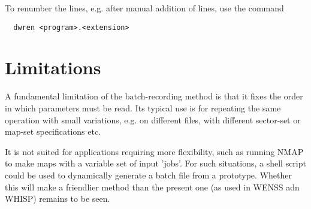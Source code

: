 	To renumber the lines, e.g. after manual addition of lines, use the command  

\verb/	dwren <program>.<extension>/


\section{ Limitations }

	A fundamental limitation of the batch-recording method is that it fixes the order in which parameters must be read. Its typical use is for repeating the same operation with small variations, e.g. on different files, with different sector-set or map-set specifications etc. 

	It is not suited for applications requiring more flexibility, such as running NMAP to make maps with a variable set of input 'jobs'. For such situations, a shell script could be used to dynamically generate a batch file from a prototype. Whether this will make a friendlier method than the present one (as used in WENSS adn WHISP) remains to be seen.   



	 

